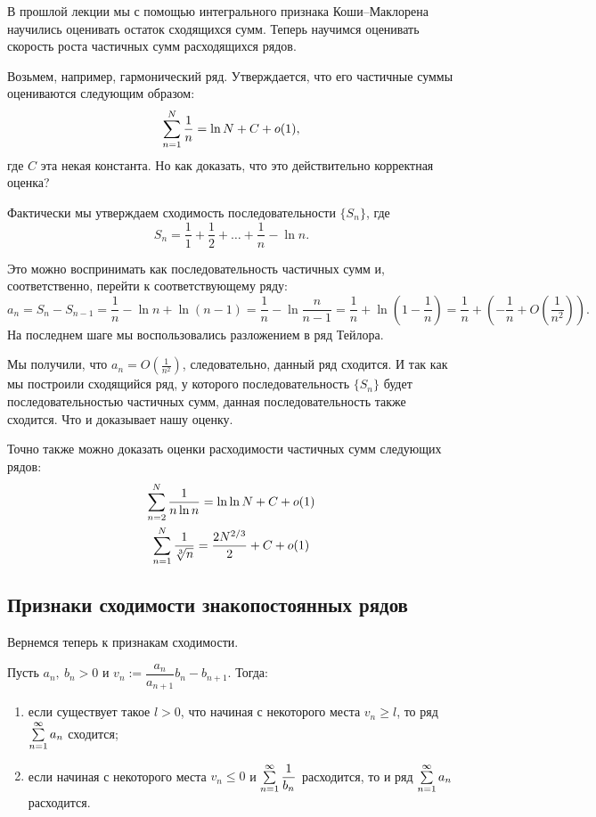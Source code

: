 \documentclass[a4paper, 12pt]{article}
\begin{document}
В прошлой лекции мы с помощью интегрального признака Коши--Маклорена научились оценивать остаток сходящихся сумм. Теперь научимся оценивать скорость роста частичных сумм расходящихся рядов.

Возьмем, например, гармонический ряд. Утверждается, что его частичные суммы оцениваются следующим образом:
$$
\sum\limits_{n=1}^{N} \frac{1}{n} = \ln N + C + o(1),
$$
где $C$ эта некая константа. Но как доказать, что это действительно корректная оценка? 

Фактически мы утверждаем сходимость последовательности $\{S_n\}$, где
$$
S_n = \frac{1}{1} + \frac{1}{2} + \ldots + \frac{1}{n} - \ln n.
$$

Это можно воспринимать как последовательность частичных сумм и, соответственно, перейти к соответствующему ряду:
$$
a_n = S_n - S_{n-1} = \frac{1}{n} - \ln n + \ln(n-1) = \frac{1}{n} - \ln\frac{n}{n-1} = \frac{1}{n} + \ln\left(1 - \frac{1}{n}\right) = \frac{1}{n} + \left( - \frac{1}{n} + O\left(\frac{1}{n^2}\right) \right).
$$
На последнем шаге мы воспользовались разложением в ряд Тейлора.

Мы получили, что $a_n = O\left(\frac{1}{n^2}\right)$, следовательно, данный ряд сходится. И так как мы построили сходящийся ряд, у которого последовательность $\{ S_n\}$ будет последовательностью частичных сумм, данная последовательность также сходится. Что и доказывает нашу оценку.

Точно также можно доказать оценки расходимости частичных сумм следующих рядов:
\begin{gather*}
\sum\limits_{n=2}^{N} \frac{1}{n\ln n} = \ln \ln N + C + o(1) \\
\sum\limits_{n=1}^{N} \frac{1}{\sqrt[3]{n}} = \frac{2N^{2/3}}{2} + C + o(1) 
\end{gather*}

\subsection{Признаки сходимости знакопостоянных рядов}
Вернемся теперь к признакам сходимости. 
\begin{Test}
Пусть $a_n,\ b_n > 0$ и $v_n := \dfrac{a_n}{a_{n+1}}b_n - b_{n+1}$. Тогда:
\begin{enumerate}
\item если существует такое $l > 0$, что начиная с некоторого места $v_n \geq l$, то ряд $\sum\limits_{n=1}^{\infty}a_n$ сходится;
\item если начиная с некоторого места $v_n \leq 0$ и $\sum\limits_{n=1}^{\infty}\dfrac{1}{b_n}$ расходится, то и ряд $\sum\limits_{n=1}^{\infty}a_n$ расходится.
\end{enumerate}
\end{Test}
\end{document}

